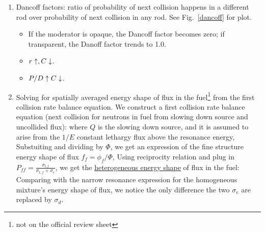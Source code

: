 \documentclass{school-22.211-notes}
\begin{document}
\begin{enumerate}
    \item Dancoff factors: ratio of probability of next collision happens in a different rod over probability of next collision in any rod. See Fig.~\ref{dancoff} for plot. 
      \begin{itemize}
      \item If the moderator is opaque, the Dancoff factor becomes zero; if transparent, the Danoff factor trends to 1.0. 
      \item $r \uparrow, C \downarrow$. 
      \item $P/D \uparrow C \downarrow$. 
      \end{itemize}

    \item Solving for spatially averaged energy shape of flux in the fuel\footnote{not on the official review sheet} from the first collision rate balance equation.  We construct a first collision rate balance equation (next collision for neutrons in fuel from slowing down source and uncollided flux): 
      where $Q$ is the slowing down source, and it is assumed to arise from the $1/E$ constant lethargy flux above the resonance energy, 
      Substuiting and dividing by $\Phi$, we get an expression of the fine structure energy shape of flux $f_f = \phi_f / \Phi$, 
      Using reciprocity relation and plug in $P_{ff} = \frac{\sigma_{t.f}}{\sigma_{t,f} + \sigma_e}$, we get the \uline{heterogeneous energy shape} of flux in the fuel: 
     Comparing with the narrow resonance expression for the homogeneous mixture's energy shape of flux, we notice the only difference the two $\sigma_e$ are replaced by $\sigma_d$. 
  \end{enumerate}
\end{document}
